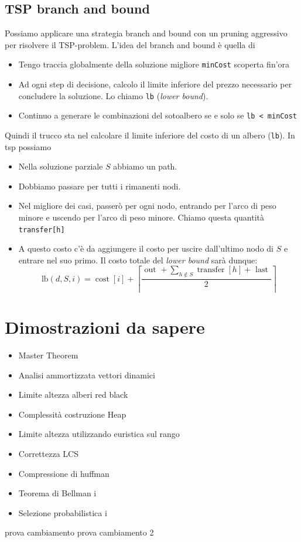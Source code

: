\subsection{TSP branch and bound}
Possiamo applicare una strategia branch and bound con un pruning aggressivo per risolvere il TSP-problem.
L'idea del branch and bound è quella di
\begin{itemize}
	\item Tengo traccia globalmente della soluzione migliore \verb|minCost| scoperta fin'ora
	\item Ad ogni step di decisione, calcolo il limite inferiore del prezzo necessario per concludere la soluzione. Lo chiamo \verb|lb| (\textit{lower bound}).
	\item Continuo a generare le combinazioni del sotoalbero se e solo se \verb|lb < minCost|
\end{itemize}
Quindi il trucco sta nel calcolare il limite inferiore del costo di un albero (\verb|lb|). In tsp possiamo
\begin{itemize}
	\item Nella soluzione parziale $ S $ abbiamo un path.
	\item Dobbiamo passare per tutti i rimanenti nodi.
	\item Nel migliore dei casi, passerò per ogni nodo, entrando per l'arco di peso minore e uscendo per l'arco di peso minore. Chiamo questa quantità \verb|transfer[h]|
	\item A questo costo c'è da aggiungere il costo per uscire dall'ultimo nodo di $ S $ e entrare nel suo primo. Il costo totale del \textit{lower bound} sarà dunque:
	      \[
		      \mathrm{lb}(d, S, i)=\operatorname{cost}[i]+\left\lceil\frac{\text { out }+\sum_{h \notin S} \operatorname{transfer}[h]+\text { last }}{2}\right\rceil
	      \]
\end{itemize}
\section{Dimostrazioni da sapere}
\begin{itemize}
	\item Master Theorem
	\item Analisi ammortizzata vettori dinamici
	\item Limite altezza alberi red black
	\item Complessità costruzione Heap
	\item Limite altezza utilizzando euristica sul rango
	\item Correttezza LCS
	\item Compressione di huffman
	\item Teorema di Bellman
	      i
	\item Selezione probabilistica
	      i
\end{itemize}

prova cambiamento
prova cambiamento 2


